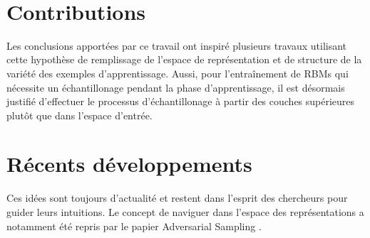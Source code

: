 \begin{center}
\\
\end{center} 

\section{Contributions}

Les conclusions apportées par ce travail ont inspiré plusieurs travaux
utilisant cette hypothèse de remplissage de l'espace de représentation et de
structure de la variété des exemples d'apprentissage. Aussi, pour l'entraînement de
RBMs qui nécessite un échantillonage pendant la phase d'apprentissage, il est
désormais justifié d'effectuer le processus d'échantillonage à partir des
couches supérieures plutôt que dans l'espace d'entrée.

\section{R\'{e}cents d\'{e}veloppements}

Ces idées sont toujours d'actualité et restent dans l'esprit des chercheurs
pour guider leurs intuitions. Le concept de naviguer dans l'espace des
représentations a notamment été repris par le papier Adversarial Sampling
\citep{Goodfellow-et-al-ARXIV2014}.
